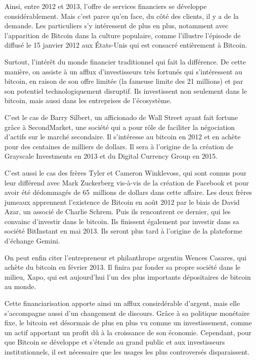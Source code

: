 Ainsi, entre 2012 et 2013, l'offre de services financiers se développe considérablement. Mais c'est parce qu'en face, du côté des clients, il y a de la demande. Les particuliers s'y intéressent de plus en plus, notamment avec l'apparition de Bitcoin dans la culture populaire, comme l'illustre l'épisode de  diffusé le 15 janvier 2012 aux États-Unis qui est consacré entièrement à Bitcoin.

Surtout, l'intérêt du monde financier traditionnel qui fait la différence. De cette manière, on assiste à un afflux d'investisseurs très fortunés qui s'intéressent au bitcoin, en raison de son offre limitée (la fameuse limite des 21 millions) et par son potentiel technologiquement disruptif. Ils investissent non seulement dans le bitcoin, mais aussi dans les entreprises de l'écosystème. 

C'est le cas de Barry Silbert, un afficionado de Wall Street ayant fait fortune grâce à SecondMarket, une société qui a pour rôle de faciliter la négociation d'actifs sur le marché secondaire. Il s'intéresse au bitcoin en 2012 et en achète pour des centaines de milliers de dollars. Il sera à l'origine de la création de Grayscale Investments en 2013 et du Digital Currency Group en 2015.

C'est aussi le cas des frères Tyler et Cameron Winklevoss, qui sont connus pour leur différend avec Mark Zuckerberg vis-à-vis de la création de Facebook et pour avoir été dédommagés de 65~millions de dollars dans cette affaire. Les deux frères jumeaux apprennent l'existence de Bitcoin en août 2012 par le biais de David Azar, un associé de Charlie Schrem. Puis ils rencontrent ce dernier, qui les convainc d'investir dans le bitcoin. Ils finissent également par investir dans sa société BitInstant en mai 2013. Ils seront plus tard à l'origine de la plateforme d'échange Gemini.

On peut enfin citer l'entrepreneur et philanthrope argentin Wences Casares, qui achète du bitcoin en février 2013. Il finira par fonder sa propre société dans le milieu, Xapo, qui est aujourd'hui l'un des plus importants dépositaires de bitcoin au monde.

Cette financiarisation apporte ainsi un afflux consirdérable d'argent, mais elle s'accompagne aussi d'un changement de discours. Grâce à sa politique monétaire fixe, le bitcoin est désormais de plus en plus vu comme un investissement, comme un actif apportant un profit dû à la croissance de son économie. Cependant, pour que Bitcoin se développe et s'étende au grand public et aux investisseurs institutionnels, il est nécessaire que les usages les plus controversés disparaissent.

